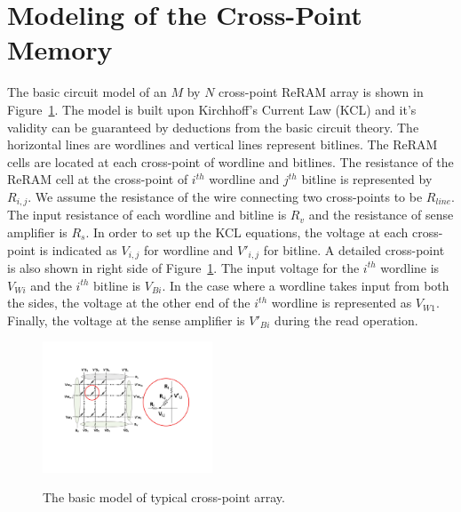 \section{Modeling of the Cross-Point Memory}\label{sec:model}


The basic circuit model of an $M$ by $N$ cross-point ReRAM array is shown
in Figure~\ref{fig:modeling}. The model is built upon Kirchhoff's Current
Law (KCL) and it's validity can be guaranteed by deductions from the basic
circuit theory. The horizontal lines are wordlines and vertical lines
represent bitlines. The ReRAM cells are located at each cross-point of
wordline and bitlines. The resistance of the ReRAM cell at the cross-point
of $i^{th}$ wordline and $j^{th}$ bitline is represented by $R_{i,j}$. We
assume the resistance of the wire connecting two cross-points to be
$R_{line}$. The input resistance of each wordline and bitline is $R_v$ and
the resistance of sense amplifier is $R_s$. In order to set up the KCL
equations, the voltage at each cross-point is indicated as $V_{i,j}$ for
wordline and $V'_{i,j}$ for bitline. A detailed cross-point is also shown
in right side of Figure~\ref{fig:modeling}. The input voltage for the
$i^{th}$ wordline is $V_{Wi}$ and the $i^{th}$ bitline is $V_{Bi}$. In the
case where a wordline takes input from both the sides, the voltage at the
other end of the $i^{th}$ wordline is represented as $V_{W1}$. Finally,
the voltage at the sense amplifier is $V'_{Bi}$ during the read operation.


\begin{figure}%
\centering
  \includegraphics[width=0.45\textwidth]{./figures/model_f.pdf}\\
  \caption{The basic model of typical cross-point array.}\label{fig:modeling}
  \vspace{-12pt}
\end{figure}

